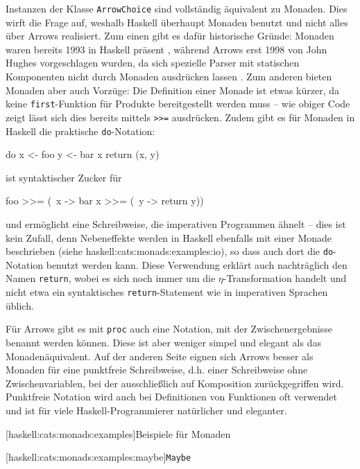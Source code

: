 \documentclass[11pt, a4paper, bibgerm]{scrbook}
\newenvironment{DIFnomarkup}{}{}
\newcommand\icode[1]{\lstinline?#1?}
\newcommand\lsubsubsection{}
\newcommand\lparagraph{}
\newcommand\sref{}
\begin{document}
Instanzen der Klasse \icode{ArrowChoice} sind vollständig äquivalent zu
Monaden.  Dies wirft die Frage auf, weshalb Haskell überhaupt Monaden
benutzt und nicht alles über Arrows realisiert. Zum einen gibt es dafür
historische Gründe: Monaden waren bereits 1993 in Haskell präsent
\cite[S.23ff]{HaskellHistory}, während Arrows erst 1998 von John Hughes
vorgeschlagen wurden, da sich spezielle Parser mit statischen
Komponenten nicht durch Monaden ausdrücken lassen \cite{Hughes}. Zum
anderen bieten Monaden aber auch Vorzüge: Die Definition einer Monade
ist etwas kürzer, da keine \icode{first}-Funktion für Produkte
bereitgestellt werden muss -- wie obiger Code zeigt lässt sich dies
bereits mittels \icode{>>=} %
ausdrücken. Zudem gibt es für Monaden in Haskell die praktische
\icode{do}-Notation:
\begin{DIFnomarkup}\begin{code}
do x <- foo
   y <- bar x
   return (x, y)
\end{code}\end{DIFnomarkup}
ist syntaktischer Zucker für
\begin{DIFnomarkup}\begin{code}
foo >>= (\ x ->
  bar x >>= (\ y ->
    return y))
\end{code}\end{DIFnomarkup} %
und ermöglicht eine Schreibweise, die imperativen Programmen ähnelt --
dies ist kein Zufall, denn Nebeneffekte werden in Haskell ebenfalls mit
einer Monade beschrieben (siehe \sref{haskell:cats:monads:examples:io}),
so dass auch dort die \icode{do}-Notation benutzt werden kann. Diese
Verwendung erklärt auch nachträglich den Namen \icode{return}, wobei es
sich noch immer um die $\eta$-Transformation handelt und nicht etwa ein
syntaktisches \icode{return}-Statement wie in imperativen Sprachen
üblich.

Für Arrows gibt es mit \icode{proc} auch eine Notation, mit der
Zwischenergebnisse benannt werden können. Diese ist aber weniger simpel
und elegant als das Monadenäquivalent. Auf der anderen Seite eignen sich
Arrows besser als Monaden für eine punktfreie Schreibweise, d.h. einer
Schreibweise ohne Zwischenvariablen, bei der ausschließlich auf
Komposition zurückgegriffen wird. Punktfreie Notation wird auch bei
Definitionen von Funktionen oft verwendet und ist für viele
Haskell-Programmierer natürlicher und eleganter.

\lsubsubsection[haskell:cats:monads:examples]{Beispiele für Monaden}

\lparagraph[haskell:cats:monads:examples:maybe]{\icode{Maybe}}
\end{document}
